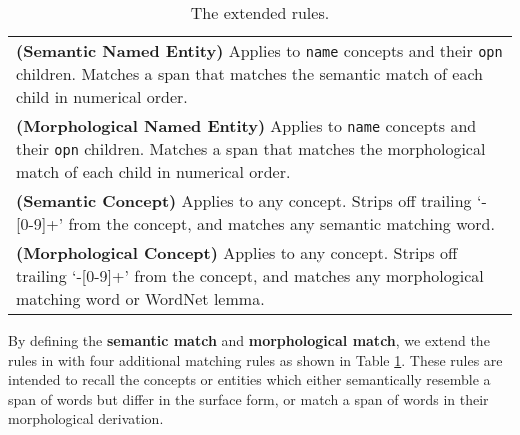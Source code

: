 \documentclass[11pt,a4paper]{article}
\begin{document}
\begin{table}[t]
	\centering
	\small
	\begin{tabular}{p{}}
		{\bf (Semantic Named Entity)} Applies to {\tt name} concepts and
		their {\tt opn} children. Matches a span that matches 
		the semantic match of each child in numerical order.\\[0.3em]
		{\bf (Morphological Named Entity)} Applies to {\tt name} concepts and
		their {\tt opn} children. Matches a span that matches 
		the morphological match of each child in numerical order.\\[0.3em]
		{\bf (Semantic Concept)} Applies to any concept. 
		Strips off trailing `-[0-9]+' from the concept,
		and matches any semantic matching word. \\[0.3em]
		{\bf (Morphological Concept)} Applies to any concept. 
		Strips off trailing `-[0-9]+' from the concept,
		and matches any morphological matching word or WordNet lemma. \\
	\end{tabular}
	\caption{The extended rules.} \label{tbl:extend-rules}
\end{table}
By defining the {\bf semantic match} and {\bf morphological match},
we extend the rules in \citet{flanigan-EtAl:2014:P14-1} with four
additional matching rules as shown in Table \ref{tbl:extend-rules}.
These rules are intended to recall the concepts or entities which
either semantically resemble a span of words but differ in the surface form,
or match a span of words in their morphological derivation.
\end{document}
